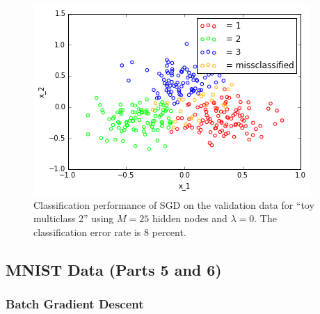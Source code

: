 \documentclass[10pt]{article}
\begin{document}
\begin{figure}
\centering
\includegraphics[scale=0.5]{SGD_toy_multiclass_2_val.png}
\caption{Classification performance of SGD on the validation data for ``toy multiclass 2'' using $M = 25$ hidden nodes and $\lambda = 0$. The classification error rate is 8 percent.}
\label{SGD_toy_2_val}
\end{figure}





\subsection*{MNIST Data (Parts 5 and 6)}

\subsubsection*{Batch Gradient Descent}
\end{document}
